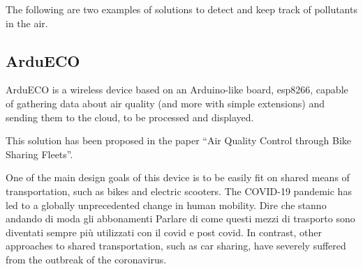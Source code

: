 	
	
	The following are two examples of solutions to detect and keep track of pollutants in the air.
	
	\subsection{ArduECO}

		
		ArduECO is a wireless device based on an Arduino-like board, esp8266, capable of gathering data about air quality (and more with simple extensions) and sending them to the cloud, to be processed and displayed.
		
		This solution has been proposed in the paper ``Air Quality Control through Bike Sharing Fleets''\cite{ardueco_paper}.
		
		One of the main design goals of this device is to be easily fit on shared means of transportation, such as bikes and electric scooters.
		The COVID-19 pandemic has led to a globally unprecedented change in human mobility.
		Dire che stanno andando di moda gli abbonamenti
		Parlare di come questi mezzi di trasporto sono diventati sempre più utilizzati con il covid e post covid.
		In contrast, other approaches to shared transportation, such as car sharing, have severely suffered from the outbreak of the coronavirus.
		
